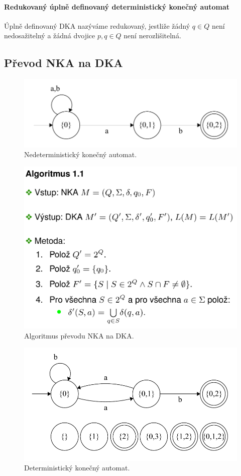 \paragraph*{Redukovaný úplně definovaný deterministický konečný automat} Úplně definovaný DKA nazýváme redukovaný, jestliže žádný $q \in Q$ není nedosažitelný a žádná dvojice $p, q \in Q$ není nerozlišitelná.

\subsection{Převod NKA na DKA}

\begin{figure}[H]
    \centering
    \includegraphics[width=0.75\linewidth]{nka.pdf}
    \caption{Nedeterministický konečný automat.}
\end{figure}

\begin{figure}[H]
    \centering
    \includegraphics[width=0.75\linewidth]{nka_to_dka.pdf}
    \caption{Algoritmus převodu NKA na DKA.}
\end{figure}

\begin{figure}[H]
    \centering
    \includegraphics[width=0.75\linewidth]{dka_uplny.pdf}
    \caption{Deterministický konečný automat.}
\end{figure}

